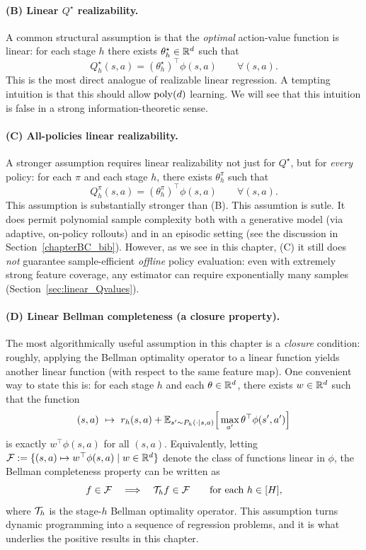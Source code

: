 \paragraph{(B) Linear $Q^\star$ realizability.}
A common structural assumption is that the \emph{optimal} action-value function is linear:
for each stage $h$ there exists $\theta_h^\star\in\mathbb{R}^d$ such that
\[
Q_h^\star(s,a) = (\theta_h^\star)^\top \phi(s,a)\qquad \forall (s,a).
\]
This is the most direct analogue of realizable linear regression.
A tempting intuition is that this should allow $\mathrm{poly}(d)$ learning.
We will see that this intuition is false in a strong information-theoretic sense.

\paragraph{(C) All-policies linear realizability.}
A stronger assumption requires linear realizability not just for $Q^\star$, but for
\emph{every} policy:
for each $\pi$ and each stage $h$, there exists $\theta_h^\pi$ such that
\[
Q_h^\pi(s,a) = (\theta_h^\pi)^\top \phi(s,a)\qquad \forall (s,a).
\]
This assumption is substantially stronger than (B).
This assumtion is sutle. It
does permit polynomial sample complexity both with a generative model (via
adaptive, on-policy rollouts) and in an episodic setting (see the discussion in
Section~\ref{chapterBC_bib}). However, as we see in this chapter, (C)
it still does \emph{not} guarantee sample-efficient \emph{offline} policy
evaluation: even with extremely strong feature coverage, any estimator can require
exponentially many samples (Section~\ref{sec:linear_Qvalues}).


\paragraph{(D) Linear Bellman completeness (a closure property).}
The most algorithmically useful assumption in this chapter is a \emph{closure}
condition: roughly, applying the Bellman optimality operator to a linear function
yields another linear function (with respect to the same feature map).
One convenient way to state this is: for each stage $h$ and each $\theta\in\mathbb{R}^d$,
there exists $w\in\mathbb{R}^d$ such that the function
\[
(s,a)\ \mapsto\ r_h(s,a) + \mathbb{E}_{s'\sim P_h(\cdot\mid s,a)}\Big[\max_{a'} \theta^\top\phi(s',a')\Big]
\]
is exactly $w^\top\phi(s,a)$ for all $(s,a)$.
Equivalently, letting $\mathcal{F} := \{(s,a)\mapsto w^\top\phi(s,a)\mid w\in\mathbb{R}^d\}$ denote the
class of functions linear in $\phi$, the Bellman completeness property can be written as
\begin{equation}\label{def:bc}
f\in \mathcal{F} \quad\Longrightarrow\quad \mathcal{T}_h f \in \mathcal{F} \qquad \text{for each } h\in[H],
\end{equation}
where $\mathcal{T}_h$ is the stage-$h$ Bellman optimality operator.
This assumption turns dynamic programming into a sequence of regression problems, and it
is what underlies the positive results in this chapter.

